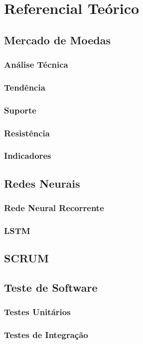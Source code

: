\chapter[Referencial Teórico]{Referencial Teórico}

\section{Mercado de Moedas}
\subsection{Análise Técnica}
\subsection{Tendência}
\subsection{Suporte}
\subsection{Resistência}
\subsection{Indicadores}

\section{Redes Neurais}

\subsection{Rede Neural Recorrente}
\subsection{LSTM}

\section{SCRUM}

\section{Teste de Software}
\subsection{Testes Unitários}
\subsection{Testes de Integração}
